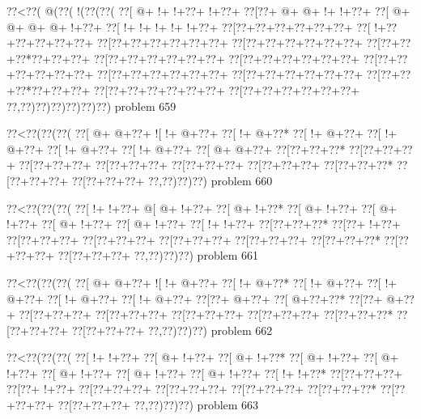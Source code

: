\vbox{\vbox{\goo
\0??<\0??(\- @(\0??(\- !(\0??(\0??(
\0??[\- @+\- !+\- !+\0??+\- !+\0??+
\0??[\0??+\- @+\- @+\- !+\- !+\0??+
\0??[\- @+\- @+\- @+\- @+\- !+\0??+
\0??[\- !+\- !+\- !+\- !+\- !+\0??+
\0??[\0??+\0??+\0??+\0??+\0??+\0??+
\0??[\- !+\0??+\0??+\0??+\0??+\0??+
\0??[\0??+\0??+\0??+\0??+\0??+\0??+
\0??[\0??+\0??+\0??+\0??+\0??+\0??+
\0??[\0??+\0??+\0??*\0??+\0??+\0??+
\0??[\0??+\0??+\0??+\0??+\0??+\0??+
\0??[\0??+\0??+\0??+\0??+\0??+\0??+
\0??[\0??+\0??+\0??+\0??+\0??+\0??+
\0??[\0??+\0??+\0??+\0??+\0??+\0??+
\0??[\0??+\0??+\0??+\0??+\0??+\0??+
\0??[\0??+\0??+\0??*\0??+\0??+\0??+
\0??[\0??+\0??+\0??+\0??+\0??+\0??+
\0??[\0??+\0??+\0??+\0??+\0??+\0??+
\0??,\0??)\0??)\0??)\0??)\0??)\0??)
}
\hfil problem 659\hfil\break
}

\vbox{\vbox{\goo
\0??<\0??(\0??(\0??(
\0??[\- @+\- @+\0??+
\- ![\- !+\- @+\0??+
\0??[\- !+\- @+\0??*
\0??[\- !+\- @+\0??+
\0??[\- !+\- @+\0??+
\0??[\- !+\- @+\0??+
\0??[\- !+\- @+\0??+
\0??[\- @+\- @+\0??+
\0??[\0??+\0??+\0??*
\0??[\0??+\0??+\0??+
\0??[\0??+\0??+\0??+
\0??[\0??+\0??+\0??+
\0??[\0??+\0??+\0??+
\0??[\0??+\0??+\0??+
\0??[\0??+\0??+\0??*
\0??[\0??+\0??+\0??+
\0??[\0??+\0??+\0??+
\0??,\0??)\0??)\0??)
}
\hfil problem 660\hfil\break
}

\vbox{\vbox{\goo
\0??<\0??(\0??(\0??(
\0??[\- !+\- !+\0??+
\- @[\- @+\- !+\0??+
\0??[\- @+\- !+\0??*
\0??[\- @+\- !+\0??+
\0??[\- @+\- !+\0??+
\0??[\- @+\- !+\0??+
\0??[\- @+\- !+\0??+
\0??[\- !+\- !+\0??+
\0??[\0??+\0??+\0??*
\0??[\0??+\- !+\0??+
\0??[\0??+\0??+\0??+
\0??[\0??+\0??+\0??+
\0??[\0??+\0??+\0??+
\0??[\0??+\0??+\0??+
\0??[\0??+\0??+\0??*
\0??[\0??+\0??+\0??+
\0??[\0??+\0??+\0??+
\0??,\0??)\0??)\0??)
}
\hfil problem 661\hfil\break
}

\vbox{\vbox{\goo
\0??<\0??(\0??(\0??(
\0??[\- @+\- @+\0??+
\- ![\- !+\- @+\0??+
\0??[\- !+\- @+\0??*
\0??[\- !+\- @+\0??+
\0??[\- !+\- @+\0??+
\0??[\- !+\- @+\0??+
\0??[\- !+\- @+\0??+
\0??[\0??+\- @+\0??+
\0??[\- @+\0??+\0??*
\0??[\0??+\- @+\0??+
\0??[\0??+\0??+\0??+
\0??[\0??+\0??+\0??+
\0??[\0??+\0??+\0??+
\0??[\0??+\0??+\0??+
\0??[\0??+\0??+\0??*
\0??[\0??+\0??+\0??+
\0??[\0??+\0??+\0??+
\0??,\0??)\0??)\0??)
}
\hfil problem 662\hfil\break
}

\vbox{\vbox{\goo
\0??<\0??(\0??(\0??(
\0??[\- !+\- !+\0??+
\0??[\- @+\- !+\0??+
\0??[\- @+\- !+\0??*
\0??[\- @+\- !+\0??+
\0??[\- @+\- !+\0??+
\0??[\- @+\- !+\0??+
\0??[\- @+\- !+\0??+
\0??[\- @+\- !+\0??+
\0??[\- !+\- !+\0??*
\0??[\0??+\0??+\0??+
\0??[\0??+\- !+\0??+
\0??[\0??+\0??+\0??+
\0??[\0??+\0??+\0??+
\0??[\0??+\0??+\0??+
\0??[\0??+\0??+\0??*
\0??[\0??+\0??+\0??+
\0??[\0??+\0??+\0??+
\0??,\0??)\0??)\0??)
}
\hfil problem 663\hfil\break
}

